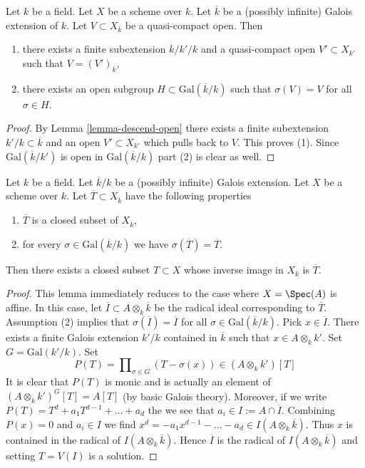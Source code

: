 \begin{lemma}
\label{lemma-Galois-action-quasi-compact-open}
Let $k$ be a field. Let $X$ be a scheme over $k$.
Let $\overline{k}$ be a (possibly infinite) Galois extension of $k$.
Let $V \subset X_{\overline{k}}$ be a quasi-compact open.
Then
\begin{enumerate}
\item there exists a finite subextension $\overline{k}/k'/k$
and a quasi-compact open $V' \subset X_{k'}$ such that
$V = (V')_{\overline{k}}$,
\item there exists an open subgroup $H \subset \text{Gal}(\overline{k}/k)$
such that $\sigma(V) = V$ for all $\sigma \in H$.
\end{enumerate}
\end{lemma}

\begin{proof}
By Lemma \ref{lemma-descend-open} there exists a finite subextension
$k'/k \subset \overline{k}$ and an open $V' \subset X_{k'}$
which pulls back to $V$. This proves (1). Since $\text{Gal}(\overline{k}/k')$
is open in $\text{Gal}(\overline{k}/k)$ part (2) is clear as well.
\end{proof}

\begin{lemma}
\label{lemma-closed-fixed-by-Galois}
Let $k$ be a field. Let $\overline{k}/k$ be a (possibly infinite)
Galois extension. Let $X$ be a scheme over $k$. Let
$\overline{T} \subset X_{\overline{k}}$ have the following properties
\begin{enumerate}
\item $\overline{T}$ is a closed subset of $X_{\overline{k}}$,
\item for every $\sigma \in \text{Gal}(\overline{k}/k)$
we have $\sigma(\overline{T}) = \overline{T}$.
\end{enumerate}
Then there exists a closed subset $T \subset X$ whose inverse image
in $X_{\overline{k}}$ is $\overline{T}$.
\end{lemma}

\begin{proof}
This lemma immediately reduces to the case where $X = \Spec(A)$
is affine. In this case, let $\overline{I} \subset A \otimes_k \overline{k}$
be the radical ideal corresponding to $\overline{T}$.
Assumption (2) implies that $\sigma(\overline{I}) = \overline{I}$
for all $\sigma \in \text{Gal}(\overline{k}/k)$.
Pick $x \in \overline{I}$. There exists a finite Galois extension
$k'/k$ contained in $\overline{k}$ such that $x \in A \otimes_k k'$.
Set $G = \text{Gal}(k'/k)$. Set
$$
P(T) = \prod\nolimits_{\sigma \in G} (T - \sigma(x)) \in (A \otimes_k k')[T]
$$
It is clear that $P(T)$ is monic and is actually an element of
$(A \otimes_k k')^G[T] = A[T]$ (by basic Galois theory).
Moreover, if we write $P(T) = T^d + a_1T^{d - 1} + \ldots + a_d$
the we see that $a_i \in I := A \cap \overline{I}$.
Combining $P(x) = 0$ and $a_i \in I$ we find
$x^d = - a_1 x^{d - 1} - \ldots  - a_d \in I(A \otimes_k \overline{k})$.
Thus $x$ is contained in the radical of $I(A \otimes_k \overline{k})$.
Hence $\overline{I}$ is the radical of $I(A \otimes_k \overline{k})$ and
setting $T = V(I)$ is a solution.
\end{proof}

